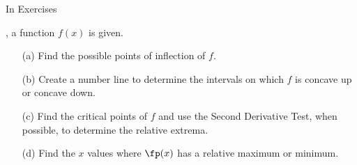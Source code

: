 {\noindent In Exercises}
{, a function $f(x)$ is given.
	\begin{enumerate}
	\item[(a)] Find the possible points of inflection of $f$.
	\item[(b)] Create a number line to determine the intervals on which $f$ is concave up or concave down.
	\item[(c)] Find the critical points of $f$ and use the Second Derivative Test, when possible, to determine the relative extrema.
	\item[(d)] Find the $x$ values where $\fp(x)$ has a relative maximum or minimum.
	\end{enumerate}
}
